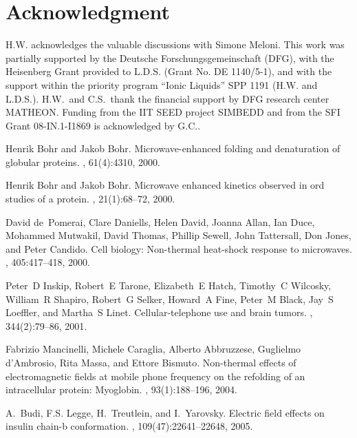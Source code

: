 \documentclass[a4paper,preprint,unsortedaddress,onecolumn]{revtex4-1}
\begin{document}
\section*{Acknowledgment}
  H.W. acknowledges the valuable discussions with Simone Meloni.
  This work was partially supported by the Deutsche
  Forschungsgemeinschaft (DFG), with the Heisenberg
  Grant provided to L.D.S. (Grant No. DE 1140/5-1),
  and with the support within the priority program ``Ionic Liquids'' SPP 1191
  (H.W. and L.D.S.). 
  H.W.~and C.S.~thank the financial support by DFG research center MATHEON.
  Funding from the IIT SEED project SIMBEDD and from the SFI Grant 08-IN.1-I1869 is acknowledged by G.C..

% 


\begin{thebibliography}{10}

Henrik Bohr and Jakob Bohr.
\newblock Microwave-enhanced folding and denaturation of globular proteins.
, 61(4):4310, 2000.

Henrik Bohr and Jakob Bohr.
\newblock Microwave enhanced kinetics observed in ord studies of a protein.
, 21(1):68--72, 2000.

David de~Pomerai, Clare Daniells, Helen David, Joanna Allan, Ian Duce, Mohammed
  Mutwakil, David Thomas, Phillip Sewell, John Tattersall, Don Jones, and Peter
  Candido.
\newblock Cell biology: Non-thermal heat-shock response to microwaves.
, 405:417--418, 2000.

Peter~D Inskip, Robert~E Tarone, Elizabeth~E Hatch, Timothy~C Wilcosky,
  William~R Shapiro, Robert~G Selker, Howard~A Fine, Peter~M Black, Jay~S
  Loeffler, and Martha~S Linet.
\newblock Cellular-telephone use and brain tumors.
, 344(2):79--86, 2001.

Fabrizio Mancinelli, Michele Caraglia, Alberto Abbruzzese, Guglielmo
  d'Ambrosio, Rita Massa, and Ettore Bismuto.
\newblock Non-thermal effects of electromagnetic fields at mobile phone
  frequency on the refolding of an intracellular protein: Myoglobin.
, 93(1):188--196, 2004.

A.~Budi, F.S. Legge, H.~Treutlein, and I.~Yarovsky.
\newblock Electric field effects on insulin chain-b conformation.
, 109(47):22641--22648,
  2005.


\end{thebibliography}
\end{document}
